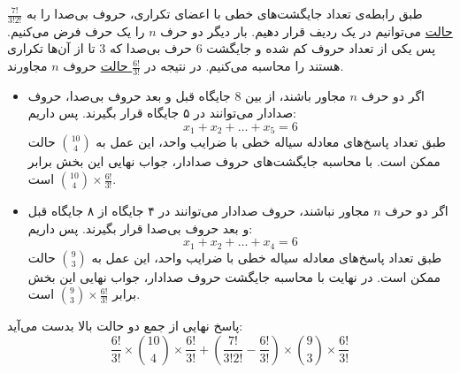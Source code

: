\p
طبق رابطه‌ی تعداد جایگشت‌های خطی با اعضای تکراری،
حروف بی‌صدا را به 
\underline{$\frac{7!}{3!2!}$ حالت}
 می‌توانیم در یک ردیف قرار دهیم.
 بار ديگر دو حرف
$n$ 
را یک حرف فرض می‌کنیم. پس یکی از تعداد حروف کم شده و جایگشت 6 حرف بی‌‌صدا که 3 تا از آن‌ها تکراری هستند را 
محاسبه می‌کنیم.
در نتیجه در 
\underline{$\frac{6!}{3!}$ حالت} 
 حروف 
$n$ مجاورند.

\begin{itemize}
\item 
اگر دو حرف
 $n$
 مجاور باشند، 
از بین 8 جایگاه قبل و بعد حروف بی‌صدا،
 حروف صدادار می‌توانند در ۵ جایگاه قرار بگیرند.
پس داریم:
$$x_1 + x_2 + \ldots + x_5 = 6$$
طبق تعداد پاسخ‌های معادله سیاله خطی با ضرایب واحد،
اين عمل به 
\underline{$\binom{10}{4}$}
حالت ممكن
است.
با محاسبه جایگشت‌های حروف صدادار، جواب نهایی این بخش برابر
\underline{$\binom{10}{4}\times\frac{6!}{3!}$}
است.
\item 
اگر دو حرف
 $n$
 مجاور نباشند، حروف صدادار می‌توانند در ۴ جایگاه از ۸ جایگاه  قبل و بعد حروف بی‌صدا قرار بگیرند. پس داریم:
$$x_1 + x_2 + \ldots + x_4 = 6$$
طبق تعداد پاسخ‌های معادله سیاله خطی با ضرایب واحد،
اين عمل به 
\underline{$\binom{9}{3}$}
حالت ممكن
است.
در نهایت با محاسبه جایگشت حروف صدادار، جواب نهایی این بخش برابر
\underline{$\binom{9}{3}\times\frac{6!}{3!}$}
است.
\end{itemize}
\p
پاسخ نهایی از جمع دو حالت بالا بدست می‌آید:
$$\frac{6!}{3!}\times\binom{10}{4}\times\frac{6!}{3!}+ (\frac{7!}{3!2!} - \frac{6!}{3!})\times\binom{9}{3}\times\frac{6!}{3!}$$
